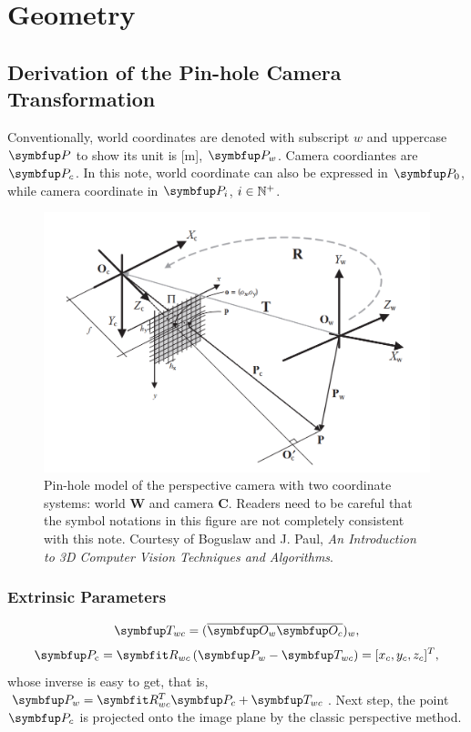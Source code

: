 \section{Geometry}
\subsection{Derivation of the Pin-hole Camera Transformation}
Conventionally, world coordinates are denoted with subscript $w$ and uppercase $\Vect{P}$ to show its unit is [m], $\Vect{P}_w$. Camera coordiantes are $\Vect{P}_c$. In this note, world coordinate  can also be expressed in $\Vect{P}_0$, while camera coordinate in $\Vect{P}_i$, $i\in {\mathbb{N}}^+$.

\begin{figure}[htbp]

\centering

\includegraphics[width=0.7\linewidth]{figure/pin_hole_model.png}

\caption{Pin-hole model of the perspective camera with two coordinate systems: world \textbf{W} and
camera \textbf{C}. Readers need to be careful that the symbol notations  in this figure are not completely consistent with this note. Courtesy of Boguslaw and J. Paul, \textit{An Introduction to 3D Computer Vision Techniques and Algorithms}.}

\end{figure}

\subsubsection{Extrinsic Parameters}
\begin{equation}
\Vect{T}_{wc} = (\overline{\Vect{O}_w \Vect{O}_c})_w,
\end{equation}
\begin{equation}
\Vect{P}_{\mathrm{c}}=\Matr{R}_{wc}  \left(\Vect{P}_{w}-\Vect{T}_{wc}\right)=[x_{c},y_c,z_c]^T,
\end{equation}
whose inverse is easy to get, that is, $\Vect{P}_{w}=\Matr{R}^{T}_{wc} \Vect{P}_{c}+\Vect{T}_{wc}$. Next step, the point $\Vect{P}_c$ is projected onto the image plane by the classic perspective method. 

